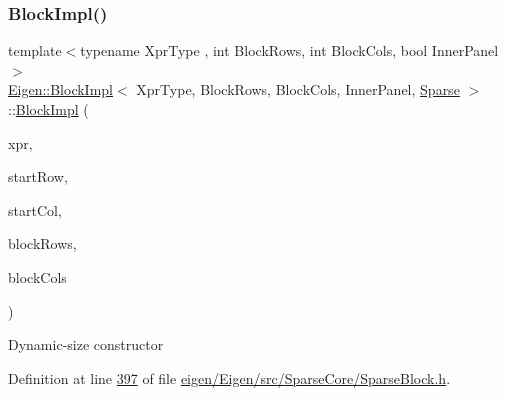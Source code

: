 \mbox{\label{class_eigen_1_1_block_impl_3_01_xpr_type_00_01_block_rows_00_01_block_cols_00_01_inner_panel_00_01_sparse_01_4_a2fe461bd49f27e586b7d0e652e370644}} 
\subsubsection{\texorpdfstring{Block\+Impl()}{BlockImpl()}\hspace{0.1cm}{\footnotesize\ttfamily [2/4]}}
{\footnotesize\ttfamily template$<$typename Xpr\+Type , int Block\+Rows, int Block\+Cols, bool Inner\+Panel$>$ \\
\hyperlink{class_eigen_1_1_block_impl}{Eigen\+::\+Block\+Impl}$<$ Xpr\+Type, Block\+Rows, Block\+Cols, Inner\+Panel, \hyperlink{struct_eigen_1_1_sparse}{Sparse} $>$\+::\hyperlink{class_eigen_1_1_block_impl}{Block\+Impl} (\begin{DoxyParamCaption}\item[{Xpr\+Type \&}]{xpr,  }\item[{\hyperlink{group___core___module_a554f30542cc2316add4b1ea0a492ff02}{Index}}]{start\+Row,  }\item[{\hyperlink{group___core___module_a554f30542cc2316add4b1ea0a492ff02}{Index}}]{start\+Col,  }\item[{\hyperlink{group___core___module_a554f30542cc2316add4b1ea0a492ff02}{Index}}]{block\+Rows,  }\item[{\hyperlink{group___core___module_a554f30542cc2316add4b1ea0a492ff02}{Index}}]{block\+Cols }\end{DoxyParamCaption})\hspace{0.3cm}{\ttfamily [inline]}}

Dynamic-\/size constructor 

Definition at line \hyperlink{eigen_2_eigen_2src_2_sparse_core_2_sparse_block_8h_source_l00397}{397} of file \hyperlink{eigen_2_eigen_2src_2_sparse_core_2_sparse_block_8h_source}{eigen/\+Eigen/src/\+Sparse\+Core/\+Sparse\+Block.\+h}.

